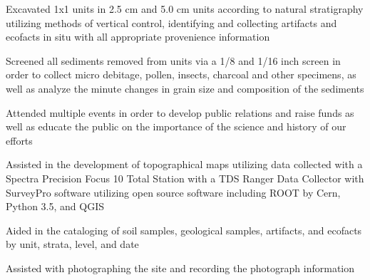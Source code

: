 \documentclass[letterpaper]{resume}
\begin{document}
\begin{compactitem}
\item Excavated 1x1 units in 2.5 cm and 5.0 cm units according to natural stratigraphy utilizing methods of vertical control, identifying and collecting artifacts and ecofacts in situ with all appropriate provenience information
\item Screened all sediments removed from units via a 1/8 and 1/16 inch screen in order to collect micro debitage, pollen, insects, charcoal and other specimens, as well as analyze the minute changes in grain size and composition of the sediments
\item Attended multiple events in order to develop public relations and raise funds as well as educate the public on the importance of the science and history of our efforts
\item Assisted in the development of topographical maps utilizing data collected with a Spectra Precision Focus 10 Total Station with a TDS Ranger Data Collector with SurveyPro software utilizing open source software including ROOT by Cern, Python 3.5, and QGIS
\item Aided in the cataloging of soil samples, geological samples, artifacts, and ecofacts  by unit, strata, level, and date
\item Assisted with photographing the site and recording the photograph information
\end{compactitem}

\end{document}
